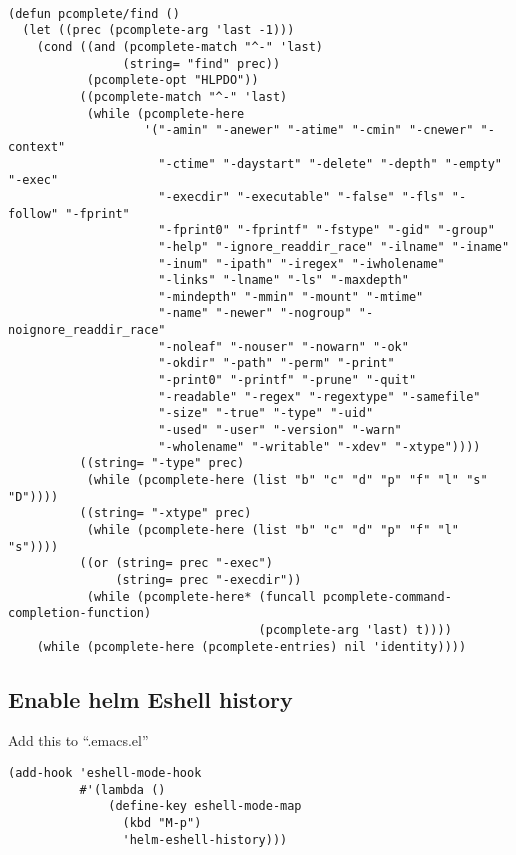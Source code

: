 \documentclass[a4paper,11pt]{article}
\newenvironment{encadre}{%
  \begin{lrbox}{\boiteencadre}%
  \begin{minipage}{.8\textwidth}}{%
  \end{minipage}
  \end{lrbox}%
  \begin{center}
    \fbox{\usebox{\boiteencadre}}
  \end{center}}
\begin{document}
\begin{verbatim}
  
(defun pcomplete/find ()
  (let ((prec (pcomplete-arg 'last -1)))
    (cond ((and (pcomplete-match "^-" 'last)
                (string= "find" prec))
           (pcomplete-opt "HLPDO"))
          ((pcomplete-match "^-" 'last)
           (while (pcomplete-here
                   '("-amin" "-anewer" "-atime" "-cmin" "-cnewer" "-context"
                     "-ctime" "-daystart" "-delete" "-depth" "-empty" "-exec"
                     "-execdir" "-executable" "-false" "-fls" "-follow" "-fprint"
                     "-fprint0" "-fprintf" "-fstype" "-gid" "-group"
                     "-help" "-ignore_readdir_race" "-ilname" "-iname"
                     "-inum" "-ipath" "-iregex" "-iwholename"
                     "-links" "-lname" "-ls" "-maxdepth"
                     "-mindepth" "-mmin" "-mount" "-mtime"
                     "-name" "-newer" "-nogroup" "-noignore_readdir_race"
                     "-noleaf" "-nouser" "-nowarn" "-ok"
                     "-okdir" "-path" "-perm" "-print"
                     "-print0" "-printf" "-prune" "-quit"
                     "-readable" "-regex" "-regextype" "-samefile"
                     "-size" "-true" "-type" "-uid"
                     "-used" "-user" "-version" "-warn"
                     "-wholename" "-writable" "-xdev" "-xtype"))))
          ((string= "-type" prec)
           (while (pcomplete-here (list "b" "c" "d" "p" "f" "l" "s" "D"))))
          ((string= "-xtype" prec)
           (while (pcomplete-here (list "b" "c" "d" "p" "f" "l" "s"))))
          ((or (string= prec "-exec")
               (string= prec "-execdir"))
           (while (pcomplete-here* (funcall pcomplete-command-completion-function)
                                   (pcomplete-arg 'last) t))))
    (while (pcomplete-here (pcomplete-entries) nil 'identity))))

\end{verbatim}
\newpage
\subsection{Enable helm Eshell history}
\label{sec:enable-anyth-eshell}

Add this to ``.emacs.el''
\begin{encadre}
\begin{verbatim}
(add-hook 'eshell-mode-hook
          #'(lambda ()
              (define-key eshell-mode-map 
                (kbd "M-p")
                'helm-eshell-history)))
\end{verbatim}
\end{encadre}
\end{document}
